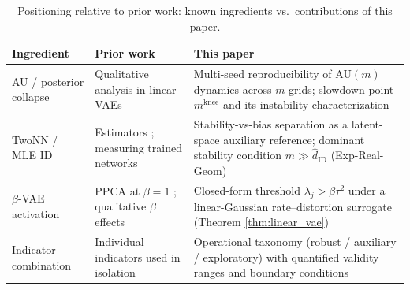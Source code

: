 \documentclass[make,article,submit,pdftex,moreauthors]{Definitions/mdpi}
\newcommand{\mknee}{m^{\mathrm{knee}}}
\newcommand{\hatdID}{\hat{d}_{\mathrm{ID}}}
\begin{document}
\begin{table}[H]
\caption{Positioning relative to prior work: known ingredients vs.\ contributions of this paper.}
\label{tab:novelty}
\begin{tabularx}{\textwidth}{p{3.4cm}XX}
\toprule
\textbf{Ingredient} & \textbf{Prior work} & \textbf{This paper} \\
\midrule
AU / posterior collapse & Qualitative analysis in linear VAEs \cite{lucas2019elbo} & Multi-seed reproducibility of AU$(m)$ dynamics across $m$-grids; slowdown point $\mknee$ and its instability characterization \\
TwoNN / MLE ID & Estimators \cite{facco2017twonn,levina2005mle}; measuring trained networks \cite{ansuini2019intrinsic,pope2021intrinsic} & Stability-vs-bias separation as a latent-space auxiliary reference; dominant stability condition $m \gg \hatdID$ (Exp-Real-Geom) \\
$\beta$-VAE activation & PPCA at $\beta=1$ \cite{tippingbishop1999ppca}; qualitative $\beta$ effects \cite{higgins2017betavae,lucas2019elbo} & Closed-form threshold $\lambda_j > \beta\tau^2$ under a linear-Gaussian rate--distortion surrogate (Theorem \ref{thm:linear_vae}) \\
Indicator combination & Individual indicators used in isolation & Operational taxonomy (robust / auxiliary / exploratory) with quantified validity ranges and boundary conditions \\
\bottomrule
\end{tabularx}
\end{table}
\end{document}
